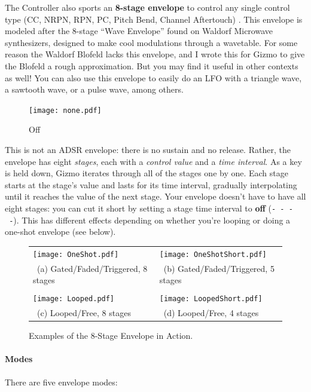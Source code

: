 \documentclass{article}
\begin{document}
The Controller also sports an {\bf 8-stage envelope} to control any single control type (CC, NRPN, RPN, PC, Pitch Bend, Channel Aftertouch)%
.  This envelope is modeled after the 8-stage ``Wave Envelope'' found on Waldorf Microwave synthesizers, designed to make cool modulations through a wavetable.  For some reason the Waldorf Blofeld lacks this envelope, and I wrote this for Gizmo to give the Blofeld a rough approximation.  But you may find it useful in other contexts as well!  You can also use this envelope to easily do an LFO with a triangle wave, a sawtooth wave, or a pulse wave, among others.

\begin{figure}
\texttt{[image: none.pdf]}
\vspace{-2em}\caption{\small Off}\vspace{-1em}
\end{figure}

 This is not an ADSR envelope: there is no sustain and no release.  Rather, the envelope has eight {\it stages}, each with a {\it control value} and a {\it time interval}.  As a key is held down, Gizmo iterates through all of the stages one by one.  Each stage starts at the stage's value and lasts for its time interval, gradually interpolating until it reaches the value of the next stage.  Your envelope doesn't have to have all eight stages: you can cut it short by setting a stage time interval to {\bf off} (\texttt{-~-~-~-}).  This has different effects depending on whether you're looping or doing a one-shot envelope (see below).


\begin{figure}[t]
\begin{center}
\begin{tabular}{@{}ll@{}}
\texttt{[image: OneShot.pdf]}&
\texttt{[image: OneShotShort.pdf]}\\
~(a) Gated/Faded/Triggered, 8 stages&
~(b) Gated/Faded/Triggered, 5 stages\\\\
\texttt{[image: Looped.pdf]}&
\texttt{[image: LoopedShort.pdf]}\\
~(c) Looped/Free, 8 stages&
~(d) Looped/Free, 4 stages
\end{tabular}
\end{center}
\caption{Examples of the 8-Stage Envelope in Action.}
\end{figure}

\paragraph{Modes}  There are five envelope modes:
\end{document}
